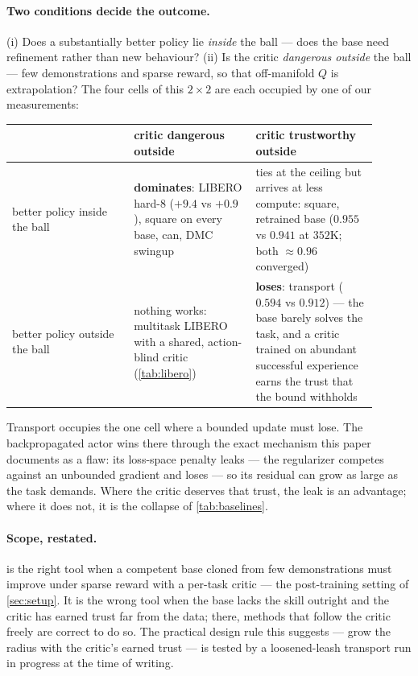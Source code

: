 \paragraph{Two conditions decide the outcome.} (i) Does a substantially
better policy lie \emph{inside} the ball --- does the base need refinement
rather than new behaviour? (ii) Is the critic \emph{dangerous outside} the
ball --- few demonstrations and sparse reward, so that off-manifold $Q$ is
extrapolation? The four cells of this $2\times 2$ are each occupied by one of
our measurements:

\begin{center}
\small
\begin{tabular}{p{0.30\linewidth}p{0.30\linewidth}p{0.30\linewidth}}
\toprule
 & critic dangerous outside & critic trustworthy outside \\
\midrule
better policy inside the ball &
\textbf{\method{} dominates}: LIBERO hard-8 ($+9.4$ vs $+0.9$), square on
every base, can, DMC swingup &
\method{} ties at the ceiling but arrives at less compute: square, retrained
base ($0.955$ vs $0.941$ at $352$K; both $\approx 0.96$ converged) \\
\addlinespace
better policy outside the ball &
nothing works: multitask LIBERO with a shared, action-blind critic
(\cref{tab:libero}) &
\textbf{\method{} loses}: transport ($0.594$ vs $0.912$) --- the base barely
solves the task, and a critic trained on abundant successful experience
earns the trust that the bound withholds \\
\bottomrule
\end{tabular}
\end{center}

Transport occupies the one cell where a bounded update must lose. The
backpropagated actor wins there through the exact mechanism this paper
documents as a flaw: its loss-space penalty leaks --- the regularizer
competes against an unbounded gradient and loses --- so its residual can grow
as large as the task demands. Where the critic deserves that trust, the leak
is an advantage; where it does not, it is the collapse of
\cref{tab:baselines}.

\paragraph{Scope, restated.} \method{} is the right tool when a competent
base cloned from few demonstrations must improve under sparse reward with a
per-task critic --- the post-training setting of \cref{sec:setup}. It is the
wrong tool when the base lacks the skill outright and the critic has earned
trust far from the data; there, methods that follow the critic freely are
correct to do so. The practical design rule this suggests --- grow the radius
with the critic's earned trust --- is tested by a loosened-leash transport
run in progress at the time of writing.
